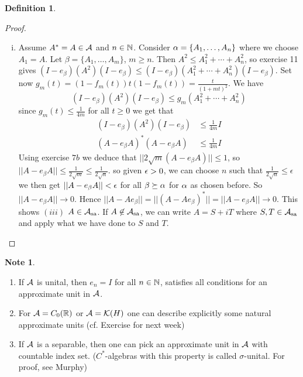 \documentclass[10pt,english,a4paper]{article}
\theoremstyle{definition}
\newtheorem*{definition}{Definition}
\newtheorem*{note}{Note}
\def\Assa{\As_{\text{sa}}}
\begin{document}
\begin{definition}
\begin{proof}
\begin{enumerate}[(i)]
\item 
Assume $A^* = A \in \mathcal{A}$ and $n \in \mathbb{N}$.
Consider $\alpha = \{A_1, \ldots, A_n\}$ where we choose $A_1 = A$.
Let  $\beta = \{A_1, \ldots, A_m\}$, $m \geq n$. Then 
$A^2 \leq A_{1}^{2} + \cdots + A_{n}^{2}$, so 
exercise 11 gives 
$(I - e_{\beta} )(A^2) (I -e_{\beta})\leq (I -e_{\beta})(A_{1}^{2} + \cdots +
A_{n}^{2})(I -e_{\beta})$. Set now 
$g_m(t) = (1-f_m(t))t (1-f_m(t)) = \frac{t}{(1+mt)^2}$.
We have 
\[ (I - e_{\beta} )(A^2) (I -e_{\beta})\leq 
g_m(A_{1}^{2} + \cdots + A_{n}^{2})
\]
since $g_m(t) \leq \frac{1}{4m}$ for all $t \geq 0$ we get that
\begin{align*}
    (I - e_{\beta} )(A^2) (I -e_{\beta}) &\leq \frac{1}{4m} I \\
    (A-e_{\beta}A)^* (A - e_{\beta}A) &\leq \frac{1}{4m} I
\end{align*}
Using exercise $7b$ we deduce that 
$||2\sqrt{m} (A -e_{\beta}A)|| \leq 1$, so $||A-e_{\beta}A|| \leq
\frac{1}{2\sqrt{m}} \leq \frac{1}{2\sqrt{n}}$.
so given $\epsilon > 0$, we can choose $n$ such that $\tfrac{1}{2\sqrt{n}} \leq \epsilon$
we then get $||A-e_{\beta}A||< \epsilon$ for all $\beta \succeq \alpha$ for $\alpha$ as 
chosen before. So $||A-e_{\beta}A || \to 0$. Hence 
$||A-Ae_{\beta}|| = ||(A - Ae_{\beta})^*|| = ||A-e_{\beta}A|| \to 0$.
This shows $(iii)$ $A \in \Assa$. If $A \not\in \Assa$, we can write 
$A = S + iT$ where $S,T \in \Assa$ and apply what we have done to $S$ and $T$.

\end{enumerate}

\end{proof}


\begin{note}
\begin{enumerate}[(1)]
    \item If $\mathcal{A}$ is unital, then $e_{n}  =I$ for all $n \in \mathbb{N}$, satisfies 
all conditions for an approximate unit in $\mathcal{A}$.

\item For $\mathcal{A} = C_{0}(\mathbb{R})$ or $\mathcal{A} = \mathcal{K}(H)$ one can describe 
explicitly some natural approximate units (cf. Exercise for next week)

\item If $\mathcal{A}$ is a separable, then one can pick an approximate unit in 
$\mathcal{A}$ with countable index set. 
($C^*$-algebras with this property is called $\sigma$-unital. For proof, see 
Murphy)

\end{enumerate}    

\end{note}

\end{definition}
\end{document}
